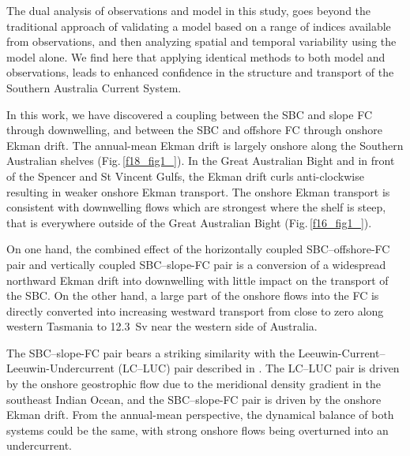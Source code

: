 \documentclass[preprint,3p,review,12pt]{elsarticle}
\begin{document}
The dual analysis of observations and model in this study, goes beyond the traditional approach of validating a model based on a range of indices available from observations, and then analyzing spatial and temporal variability using the model alone. We find here that applying identical methods to both model and observations, leads to enhanced confidence in the structure and transport of the Southern Australia Current System.

In this work, we have discovered a coupling between the SBC and slope FC through downwelling, and between the SBC and offshore FC through onshore Ekman drift. The annual-mean Ekman drift is largely onshore along the Southern Australian shelves (Fig.\,\ref{f18_fig1_}). In the Great Australian Bight and in front of the Spencer and St Vincent Gulfs, the Ekman drift curls anti-clockwise resulting in weaker onshore Ekman transport. The onshore Ekman transport is consistent with downwelling flows which are strongest where the shelf is steep, that is everywhere outside of the Great Australian Bight (Fig.\,\ref{f16_fig1_}).

On one hand, the combined effect of the horizontally coupled SBC--offshore-FC pair and vertically coupled SBC--slope-FC pair is a conversion of a widespread northward Ekman drift into downwelling with little impact on the transport of the SBC\@. On the other hand, a large part of the onshore flows into the FC is directly converted into increasing westward transport from close to zero along western Tasmania to \SI{12.3}{Sv} near the western side of Australia. 

The SBC--slope-FC pair bears a striking similarity with the Leeuwin-Current--Leeuwin-Undercurrent (LC--LUC) pair described in \citet{Furue2017}. The LC--LUC pair is driven by the onshore geostrophic flow due to the meridional density gradient in the southeast Indian Ocean, and the SBC--slope-FC pair is driven by the onshore Ekman drift. From the annual-mean perspective, the dynamical balance of both systems could be the same, with strong onshore flows being overturned into an undercurrent.
\end{document}
